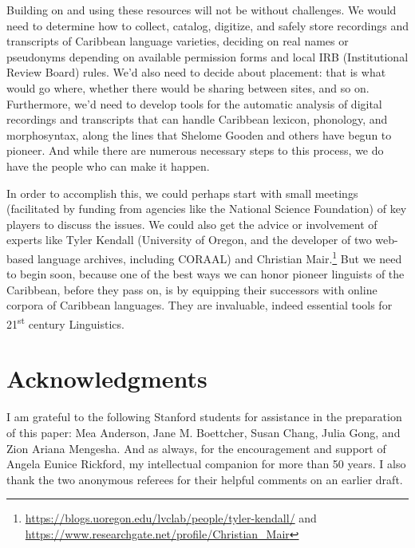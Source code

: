 \documentclass[output=paper,colorlinks,citecolor=brown]{langscibook}
\begin{document}
Building on and using these resources will not be without challenges. We would need to determine how to collect, catalog, digitize, and safely store recordings and transcripts of Caribbean language varieties, deciding on real names or pseudonyms depending on available permission forms and local IRB (Institutional Review Board) rules. We’d also need to decide about placement: that is what would go where, whether there would be sharing between sites, and so on. Furthermore, we’d need to develop tools for the automatic analysis of digital recordings and transcripts that can handle Caribbean lexicon, phonology, and morphosyntax, along the lines that Shelome Gooden and others have begun to pioneer. And while there are numerous necessary steps to this process, we do have the people who can make it happen. 

In order to accomplish this, we could perhaps start with small meetings (facilitated by funding from agencies like the National Science Foundation) of key players to discuss the issues. We could also get the advice or involvement of experts like Tyler Kendall (University of Oregon, and the developer of two web-based language archives, including CORAAL)  and Christian Mair.\footnote{\url{https://blogs.uoregon.edu/lvclab/people/tyler-kendall/} and \url{https://www.researchgate.net/profile/Christian_Mair}}   But we need to begin soon, because one of the best ways we can honor pioneer linguists of the Caribbean, before they pass on, is by equipping their successors with online corpora of Caribbean languages.  They are invaluable, indeed essential tools for 21\textsuperscript{st} century Linguistics.


\section*{Acknowledgments}
I am grateful to the following Stanford students for assistance in the preparation of this paper: Mea Anderson, Jane M. Boettcher, Susan Chang, Julia Gong, and Zion Ariana Mengesha.  And as always, for the encouragement and support of Angela Eunice Rickford, my intellectual companion for more than 50 years.   I also thank the two anonymous referees for their helpful comments on an earlier draft.
\end{document}
